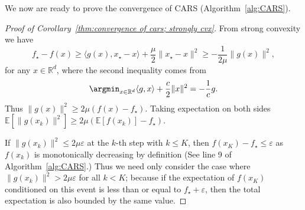 We now are ready to prove the convergence of CARS (Algorithm~\ref{alg:CARS}).
\begin{proof}[Proof of Corollary~\ref{thm:convergence of cars; strongly cvx}]
    From strong convexity
    we have
    \begin{equation*}
        f_\star - f(x) \geq \langle g(x), x_{\star} - x \rangle + \frac{\mu}{2}\|x_{\star} - x\|^2
        \geq -\frac{1}{2\mu}\|g(x)\|^2,
    \end{equation*}
    for any $x \in \mathbb{R}^d$, where the second inequality comes from
    \begin{equation*}
        \argmin_{x\in\mathbb{R}^d} \langle g, x \rangle + \frac{c}{2}\|x\|^2 = -\frac{1}{c}g.
    \end{equation*}
    Thus $\|g(x)\|^2 \geq 2\mu(f(x)-f_{\star})$. Taking expectation on both sides $\mathbb{E}[\|g(x_k)\|^2] \geq 2\mu (\mathbb{E}[f(x_k)]-f_{\star})$.

    If $\|g(x_k)\|^2 \leq 2\mu\varepsilon$ at the $k$-th step with $k\leq K$, then $f(x_K) - f_{\star} \leq \varepsilon$ as $f(x_k)$ is monotonically decreasing by definition (See line 9 of Algorithm~\ref{alg:CARS}.) Thus we need only consider the case where $\|g(x_k)\|^2 > 2\mu\varepsilon$ for all $k<K$; because if the expectation of $f(x_K)$ conditioned on this event is less than or equal to $f_{\star} + \varepsilon$, then the total expectation is also bounded by the same value.


\end{proof}
